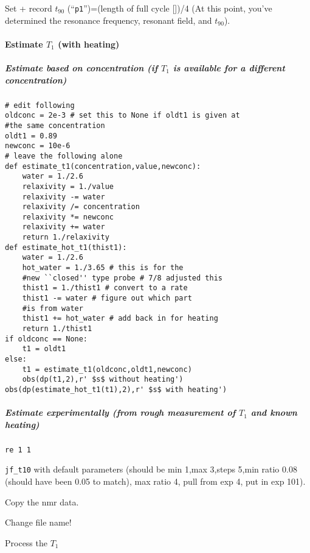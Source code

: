 \begin{scriptsize}
\begin{python}[off]
Set + record $t_{90}$ (``\texttt{p1}'')=(length of full cycle [\us])/4 (At this point, you've determined the resonance frequency, resonant field, and $t_{90}$).

\paragraph{Estimate $T_1$ (with heating)}

\subparagraph{Estimate based on concentration {\tiny (if $T_1$ is available for a different concentration)}}

\begin{lstlisting}
# edit following
oldconc = 2e-3 # set this to None if oldt1 is given at
#the same concentration
oldt1 = 0.89
newconc = 10e-6
# leave the following alone
def estimate_t1(concentration,value,newconc):
    water = 1./2.6
    relaxivity = 1./value
    relaxivity -= water
    relaxivity /= concentration
    relaxivity *= newconc
    relaxivity += water
    return 1./relaxivity
def estimate_hot_t1(thist1):
    water = 1./2.6
    hot_water = 1./3.65 # this is for the
    #new ``closed'' type probe # 7/8 adjusted this
    thist1 = 1./thist1 # convert to a rate
    thist1 -= water # figure out which part
    #is from water
    thist1 += hot_water # add back in for heating
    return 1./thist1
if oldconc == None:
    t1 = oldt1
else:
    t1 = estimate_t1(oldconc,oldt1,newconc)
    obs(dp(t1,2),r' $s$ without heating')
obs(dp(estimate_hot_t1(t1),2),r' $s$ with heating')
\end{lstlisting}

\subparagraph{Estimate experimentally (from rough measurement of $T_1$ and known heating)}

\texttt{re 1 1}

\texttt{jf\_t10} with default parameters (should be min 1,max 3,steps 5,min ratio 0.08 (should have been 0.05 to match), max ratio 4, pull from exp 4, put in exp 101).

Copy the nmr data.

Change file name!

Process the $T_1$



\end{python}
\end{scriptsize}
